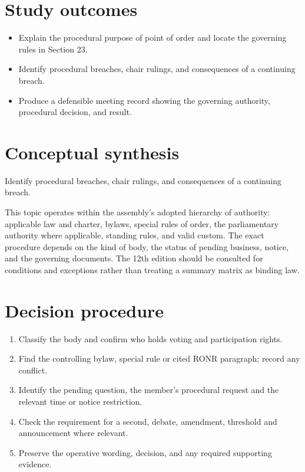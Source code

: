 \documentclass[11pt]{article}
\begin{document}
\SuiteOpen
{}
\section{Study outcomes}
\begin{itemize}[leftmargin=*,itemsep=4pt]
\item Explain the procedural purpose of point of order and locate the governing rules in Section 23.
\item Identify procedural breaches, chair rulings, and consequences of a continuing breach.
\item Produce a defensible meeting record showing the governing authority, procedural decision, and result.
\end{itemize}

\section{Conceptual synthesis}
Identify procedural breaches, chair rulings, and consequences of a continuing breach.

This topic operates within the assembly’s adopted hierarchy of authority: applicable law and charter, bylaws, special rules of order, the parliamentary authority where applicable, standing rules, and valid custom. The exact procedure depends on the kind of body, the status of pending business, notice, and the governing documents. The 12th edition should be consulted for conditions and exceptions rather than treating a summary matrix as binding law.
\section{Decision procedure}
\begin{enumerate}[leftmargin=*,itemsep=4pt]
\item Classify the body and confirm who holds voting and participation rights.
\item Find the controlling bylaw, special rule or cited RONR paragraph; record any conflict.
\item Identify the pending question, the member’s procedural request and the relevant time or notice restriction.
\item Check the requirement for a second, debate, amendment, threshold and announcement where relevant.
\item Preserve the operative wording, decision, and any required supporting evidence.
\end{enumerate}
\end{document}
